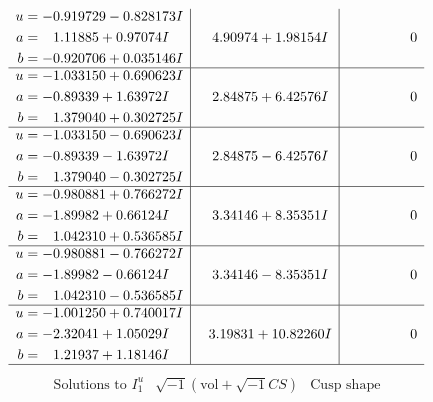 \documentclass[1p]{elsarticle_modified}
\theoremstyle{definition}
\newcommand{\I}{\sqrt{-1}}
\begin{document}
$$\begin{array}{c|c|c}
\begin{aligned}
u &= -0.919729 - 0.828173 I \\
a &= \phantom{-}1.11885 + 0.97074 I \\
b &= -0.920706 + 0.035146 I\end{aligned}
 & \phantom{-}4.90974 + 1.98154 I & \phantom{-0.000000 } 0 \\ \hline\begin{aligned}
u &= -1.033150 + 0.690623 I \\
a &= -0.89339 + 1.63972 I \\
b &= \phantom{-}1.379040 + 0.302725 I\end{aligned}
 & \phantom{-}2.84875 + 6.42576 I & \phantom{-0.000000 } 0 \\ \hline\begin{aligned}
u &= -1.033150 - 0.690623 I \\
a &= -0.89339 - 1.63972 I \\
b &= \phantom{-}1.379040 - 0.302725 I\end{aligned}
 & \phantom{-}2.84875 - 6.42576 I & \phantom{-0.000000 } 0 \\ \hline\begin{aligned}
u &= -0.980881 + 0.766272 I \\
a &= -1.89982 + 0.66124 I \\
b &= \phantom{-}1.042310 + 0.536585 I\end{aligned}
 & \phantom{-}3.34146 + 8.35351 I & \phantom{-0.000000 } 0 \\ \hline\begin{aligned}
u &= -0.980881 - 0.766272 I \\
a &= -1.89982 - 0.66124 I \\
b &= \phantom{-}1.042310 - 0.536585 I\end{aligned}
 & \phantom{-}3.34146 - 8.35351 I & \phantom{-0.000000 } 0 \\ \hline\begin{aligned}
u &= -1.001250 + 0.740017 I \\
a &= -2.32041 + 1.05029 I \\
b &= \phantom{-}1.21937 + 1.18146 I\end{aligned}
 & \phantom{-}3.19831 + 10.82260 I & \phantom{-0.000000 } 0\\
 \hline 
 \end{array}$$\newpage$$\begin{array}{c|c|c}  
\text{Solutions to }I^u_{1}& \I (\text{vol} + \sqrt{-1}CS) & \text{Cusp shape}\\
 \hline 
\begin{aligned}

\end{aligned}
\end{array}$$
\end{document}

